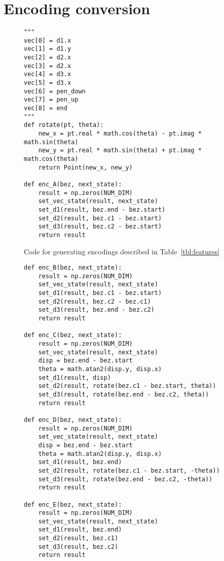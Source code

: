 \chapter{Encoding conversion}\label{app:enc}

\begin{figure}[h]
    \caption{Code for generating encodings described in Table~\ref{tbl:features}\label{appfig:features-code}}
\begin{verbatim}
"""
vec[0] = d1.x
vec[1] = d1.y
vec[2] = d2.x
vec[3] = d2.x
vec[4] = d3.x
vec[5] = d3.x
vec[6] = pen_down
vec[7] = pen_up
vec[8] = end
"""
def rotate(pt, theta):
    new_x = pt.real * math.cos(theta) - pt.imag * math.sin(theta)
    new_y = pt.real * math.sin(theta) + pt.imag * math.cos(theta)
    return Point(new_x, new_y)

def enc_A(bez, next_state):
    result = np.zeros(NUM_DIM)
    set_vec_state(result, next_state)
    set_d1(result, bez.end - bez.start)
    set_d2(result, bez.c1 - bez.start)
    set_d3(result, bez.c2 - bez.start)
    return result
\end{verbatim}
\end{figure}

\begin{figure}[h]
\begin{verbatim}
def enc_B(bez, next_state):
    result = np.zeros(NUM_DIM)
    set_vec_state(result, next_state)
    set_d1(result, bez.c1 - bez.start)
    set_d2(result, bez.c2 - bez.c1)
    set_d3(result, bez.end - bez.c2)
    return result

def enc_C(bez, next_state):
    result = np.zeros(NUM_DIM)
    set_vec_state(result, next_state)
    disp = bez.end - bez.start
    theta = math.atan2(disp.y, disp.x)
    set_d1(result, disp)
    set_d2(result, rotate(bez.c1 - bez.start, theta))
    set_d3(result, rotate(bez.end - bez.c2, theta))
    return result

def enc_D(bez, next_state):
    result = np.zeros(NUM_DIM)
    set_vec_state(result, next_state)
    disp = bez.end - bez.start
    theta = math.atan2(disp.y, disp.x)
    set_d1(result, bez.end)
    set_d2(result, rotate(bez.c1 - bez.start, -theta))
    set_d3(result, rotate(bez.end - bez.c2, -theta))
    return result

def enc_E(bez, next_state):
    result = np.zeros(NUM_DIM)
    set_vec_state(result, next_state)
    set_d1(result, bez.end)
    set_d2(result, bez.c1)
    set_d3(result, bez.c2)
    return result
\end{verbatim}
\end{figure}

\clearpage
\newpage
